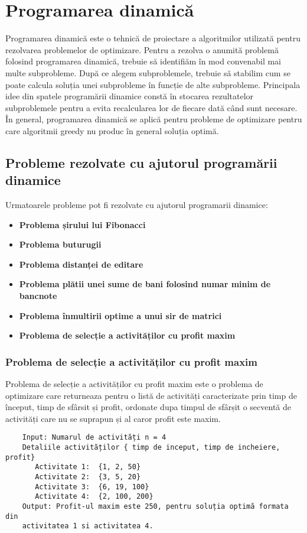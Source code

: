\chapter{Programarea dinamică}
Programarea dinamică este o tehnică de proiectare a algoritmilor utilizată pentru rezolvarea problemelor de optimizare.
Pentru a rezolva o anumită problemă folosind programarea dinamică, trebuie să identifiăm în mod convenabil mai multe subprobleme.
După ce alegem subproblemele, trebuie să stabilim cum se poate calcula soluția unei subprobleme în funcție de alte subprobleme.
Principala idee din spatele programării dinamice constă în stocarea rezultatelor subproblemele pentru a evita recalcularea lor de fiecare dată când sunt necesare. În general, programarea dinamică se aplică pentru probleme de optimizare pentru care algoritmii greedy nu produc în general soluția optimă.

\section{Probleme rezolvate cu ajutorul programării dinamice}
Urmatoarele probleme pot fi rezolvate cu ajutorul programarii dinamice:
\begin{itemize}
  \item \textbf {Problema șirului lui Fibonacci} 
  \item \textbf {Problema buturugii} 
  \item \textbf {Problema distanței de editare} 
  \item \textbf {Problema plătii unei sume de bani folosind numar minim de bancnote} 
  \item \textbf {Problema înmultirii optime a unui sir de matrici}
  \item \textbf {Problema de selecție a activităților cu profit maxim}
  
\end{itemize}
\subsection{Problema de selecție a activităților cu profit maxim}
Problema de selecție a activităților cu profit maxim este o problema de optimizare care returneaza pentru o listă de activități caracterizate prin timp de început, timp de sfârsit și profit,  ordonate dupa timpul de sfârșit o secventă de activități care nu se suprapun și al caror profit este maxim. 
\begin{verbatim}
    Input: Numarul de activități n = 4
    Detaliile activităților { timp de inceput, timp de incheiere,  profit}
       Activitate 1:  {1, 2, 50} 
       Activitate 2:  {3, 5, 20}
       Activitate 3:  {6, 19, 100}
       Activitate 4:  {2, 100, 200}
    Output: Profit-ul maxim este 250, pentru soluția optimă formata din
    activitatea 1 si activitatea 4.
\end{verbatim}
